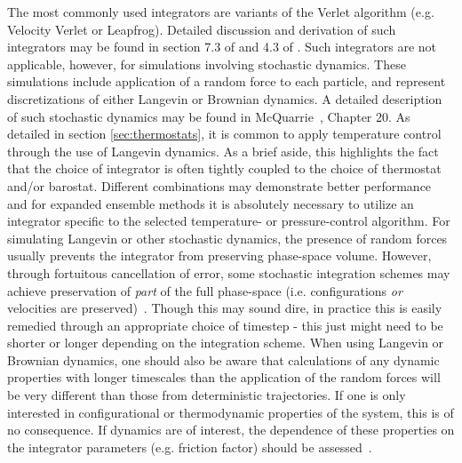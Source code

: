 \documentclass[9pt,bestpractices]{livecoms}
\begin{document}
The most commonly used integrators are variants of the Verlet algorithm (e.g. Velocity Verlet or Leapfrog). 
Detailed discussion and derivation of such integrators may be found in section 7.3 of \citet{LeachBook} and 4.3 of \citet{Frenkel:2001:}.
Such integrators are not applicable, however, for simulations involving stochastic dynamics.
These simulations include application of a random force to each particle, and represent discretizations of either Langevin or Brownian dynamics.
A detailed description of such stochastic dynamics may be found in McQuarrie~\cite{McQuarrieStatMechBook}, Chapter 20.
As detailed in section \ref{sec:thermostats}, it is common to apply temperature control through the use of Langevin dynamics.
As a brief aside, this highlights the fact that the choice of integrator is often tightly coupled to the choice of thermostat and/or barostat.
Different combinations may demonstrate better performance and for expanded ensemble methods it is absolutely necessary to utilize an integrator specific to the selected temperature- or pressure-control algorithm.
For simulating Langevin or other stochastic dynamics, the presence of random forces usually prevents the integrator from preserving phase-space volume.
However, through fortuitous cancellation of error, some stochastic integration schemes may achieve preservation of \textit{part} of the full phase-space (i.e. configurations \textit{or} velocities are preserved)~\cite{Fass2018}.
Though this may sound dire, in practice this is easily remedied through an appropriate choice of timestep - this just might need to be shorter or longer depending on the integration scheme.
When using Langevin or Brownian dynamics, one should also be aware that calculations of any dynamic properties with longer timescales than the application of the random forces will be very different than those from deterministic trajectories.
If one is only interested in configurational or thermodynamic properties of the system, this is of no consequence.
If dynamics are of interest, the dependence of these properties on the integrator parameters (e.g. friction factor) should be assessed~\cite{Basconi:2013:J.Chem.TheoryComput.}.

\end{document}

